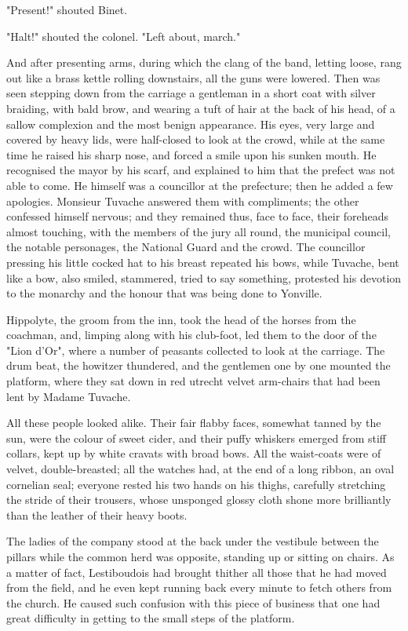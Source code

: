 \documentclass{tufte-book}
\begin{document}
"Present!" shouted Binet.

"Halt!" shouted the colonel. "Left about, march."

And after presenting arms, during which the clang of the band, letting
loose, rang out like a brass kettle rolling downstairs, all the guns
were lowered. Then was seen stepping down from the carriage a gentleman
in a short coat with silver braiding, with bald brow, and wearing a tuft
of hair at the back of his head, of a sallow complexion and the most
benign appearance. His eyes, very large and covered by heavy lids, were
half-closed to look at the crowd, while at the same time he raised his
sharp nose, and forced a smile upon his sunken mouth. He recognised the
mayor by his scarf, and explained to him that the prefect was not able
to come. He himself was a councillor at the prefecture; then he added
a few apologies. Monsieur Tuvache answered them with compliments; the
other confessed himself nervous; and they remained thus, face to face,
their foreheads almost touching, with the members of the jury all round,
the municipal council, the notable personages, the National Guard and
the crowd. The councillor pressing his little cocked hat to his
breast repeated his bows, while Tuvache, bent like a bow, also smiled,
stammered, tried to say something, protested his devotion to the
monarchy and the honour that was being done to Yonville.

Hippolyte, the groom from the inn, took the head of the horses from the
coachman, and, limping along with his club-foot, led them to the door
of the "Lion d'Or", where a number of peasants collected to look at the
carriage. The drum beat, the howitzer thundered, and the gentlemen one
by one mounted the platform, where they sat down in red utrecht velvet
arm-chairs that had been lent by Madame Tuvache.

All these people looked alike. Their fair flabby faces, somewhat tanned
by the sun, were the colour of sweet cider, and their puffy whiskers
emerged from stiff collars, kept up by white cravats with broad bows.
All the waist-coats were of velvet, double-breasted; all the watches
had, at the end of a long ribbon, an oval cornelian seal; everyone
rested his two hands on his thighs, carefully stretching the stride of
their trousers, whose unsponged glossy cloth shone more brilliantly than
the leather of their heavy boots.

The ladies of the company stood at the back under the vestibule between
the pillars while the common herd was opposite, standing up or sitting
on chairs. As a matter of fact, Lestiboudois had brought thither all
those that he had moved from the field, and he even kept running back
every minute to fetch others from the church. He caused such confusion
with this piece of business that one had great difficulty in getting to
the small steps of the platform.
\end{document}
